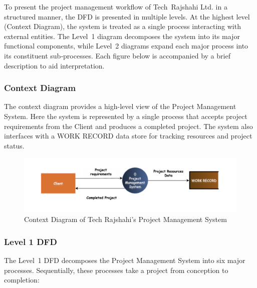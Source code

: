 \documentclass[12pt,a4paper]{article}
\newcommand{\company}[1]{#1}
\begin{document}
To present the project management workflow of \company{Tech Rajshahi Ltd.} in a structured manner, the DFD is presented in multiple levels.  At the highest level (Context Diagram), the system is treated as a single process interacting with external entities.  The Level~1 diagram decomposes the system into its major functional components, while Level~2 diagrams expand each major process into its constituent sub‑processes.  Each figure below is accompanied by a brief description to aid interpretation.

\newpage
\subsubsection{Context Diagram}
\noindent
The context diagram provides a high-level view of the Project Management System.  Here the system is represented by a single process that accepts project requirements from the Client and produces a completed project. The system also interfaces with a WORK RECORD data store for tracking resources and project status.

\begin{figure}[H]
    \centering
    \includegraphics[width=\textwidth]{Fig/context_dfd.png}
    \caption{Context Diagram of Tech Rajshahi's Project Management System}
    \label{fig:context_dfd}
\end{figure}

\subsubsection{Level 1 DFD}
The Level~1 DFD decomposes the Project Management System into six major processes. Sequentially, these processes take a project from conception to completion:
\end{document}
